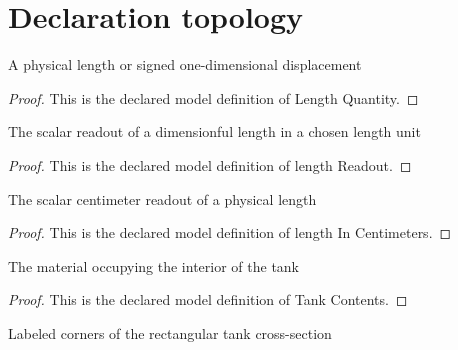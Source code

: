 \section{Declaration topology}
\begin{definition}
  \label{def:physics:phyx-mini-0070:phyxminiproblems-problemphyxmini0070-lengthquantity}
  A physical length or signed one-dimensional displacement
\end{definition}
\begin{proof}
  This is the declared model definition of Length Quantity.
\end{proof}
\begin{definition}
  \label{def:physics:phyx-mini-0070:phyxminiproblems-problemphyxmini0070-lengthreadout}
  The scalar readout of a dimensionful length in a chosen length unit
\end{definition}
\begin{proof}
  This is the declared model definition of length Readout.
\end{proof}
\begin{definition}
  \label{def:physics:phyx-mini-0070:phyxminiproblems-problemphyxmini0070-lengthincentimeters}
  The scalar centimeter readout of a physical length
\end{definition}
\begin{proof}
  This is the declared model definition of length In Centimeters.
\end{proof}
\begin{definition}
  \label{def:physics:phyx-mini-0070:phyxminiproblems-problemphyxmini0070-tankcontents}
  The material occupying the interior of the tank
\end{definition}
\begin{proof}
  This is the declared model definition of Tank Contents.
\end{proof}
\begin{definition}
  \label{def:physics:phyx-mini-0070:phyxminiproblems-problemphyxmini0070-tankcorner}
  Labeled corners of the rectangular tank cross-section
\end{definition}
